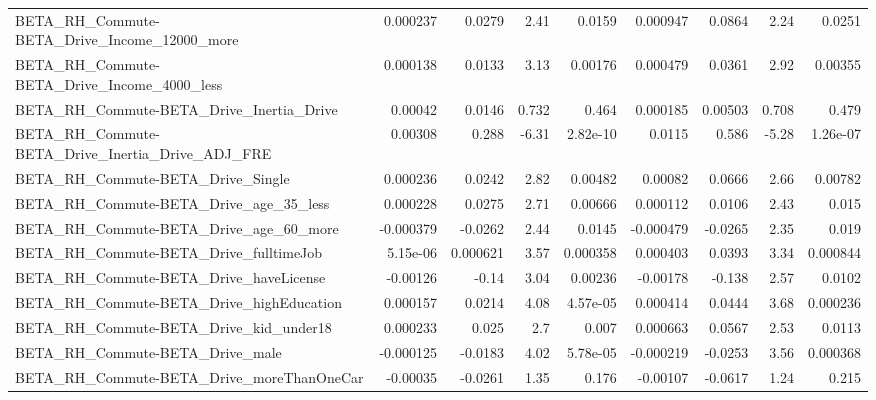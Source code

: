 \begin{tabular}{lrrrrrrrr}
BETA\_RH\_Commute-BETA\_Drive\_Income\_12000\_more       &    0.000237 &       0.0279 &     2.41 &   0.0159 &   0.000947 &      0.0864 &         2.24 &        0.0251 \\
BETA\_RH\_Commute-BETA\_Drive\_Income\_4000\_less        &    0.000138 &       0.0133 &     3.13 &  0.00176 &   0.000479 &      0.0361 &         2.92 &       0.00355 \\
BETA\_RH\_Commute-BETA\_Drive\_Inertia\_Drive           &     0.00042 &       0.0146 &    0.732 &    0.464 &   0.000185 &     0.00503 &        0.708 &         0.479 \\
BETA\_RH\_Commute-BETA\_Drive\_Inertia\_Drive\_ADJ\_FRE   &     0.00308 &        0.288 &    -6.31 & 2.82e-10 &     0.0115 &       0.586 &        -5.28 &      1.26e-07 \\
BETA\_RH\_Commute-BETA\_Drive\_Single                  &    0.000236 &       0.0242 &     2.82 &  0.00482 &    0.00082 &      0.0666 &         2.66 &       0.00782 \\
BETA\_RH\_Commute-BETA\_Drive\_age\_35\_less             &    0.000228 &       0.0275 &     2.71 &  0.00666 &   0.000112 &      0.0106 &         2.43 &         0.015 \\
BETA\_RH\_Commute-BETA\_Drive\_age\_60\_more             &   -0.000379 &      -0.0262 &     2.44 &   0.0145 &  -0.000479 &     -0.0265 &         2.35 &         0.019 \\
BETA\_RH\_Commute-BETA\_Drive\_fulltimeJob             &    5.15e-06 &     0.000621 &     3.57 & 0.000358 &   0.000403 &      0.0393 &         3.34 &      0.000844 \\
BETA\_RH\_Commute-BETA\_Drive\_haveLicense             &    -0.00126 &        -0.14 &     3.04 &  0.00236 &   -0.00178 &      -0.138 &         2.57 &        0.0102 \\
BETA\_RH\_Commute-BETA\_Drive\_highEducation           &    0.000157 &       0.0214 &     4.08 & 4.57e-05 &   0.000414 &      0.0444 &         3.68 &      0.000236 \\
BETA\_RH\_Commute-BETA\_Drive\_kid\_under18             &    0.000233 &        0.025 &      2.7 &    0.007 &   0.000663 &      0.0567 &         2.53 &        0.0113 \\
BETA\_RH\_Commute-BETA\_Drive\_male                    &   -0.000125 &      -0.0183 &     4.02 & 5.78e-05 &  -0.000219 &     -0.0253 &         3.56 &      0.000368 \\
BETA\_RH\_Commute-BETA\_Drive\_moreThanOneCar          &    -0.00035 &      -0.0261 &     1.35 &    0.176 &   -0.00107 &     -0.0617 &         1.24 &         0.215 \\

\end{tabular}
